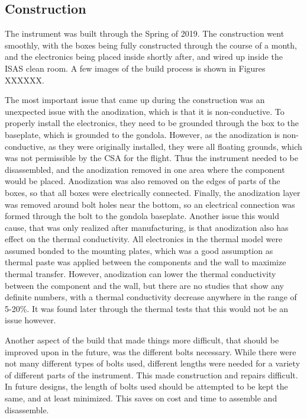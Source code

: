 \subsection{Construction}
The instrument was built through the Spring of 2019. The construction went smoothly, with the boxes being fully constructed through the course of a month, and the electronics being placed inside shortly after, and wired up inside the ISAS clean room. A few images of the build process is shown in Figures XXXXXX.

The most important issue that came up during the construction was an unexpected issue with the anodization, which is that it is non-conductive. To properly install the electronics, they need to be grounded through the box to the baseplate, which is grounded to the gondola. However, as the anodization is non-conductive, as they were originally installed, they were all floating grounds, which was not permissible by the CSA for the flight. Thus the instrument needed to be disassembled, and the anodization removed in one area where the component would be placed. Anodization was also removed on the edges of parts of the boxes, so that all boxes were electrically connected. Finally, the anodization layer was removed around bolt holes near the bottom, so an electrical connection was formed through the bolt to the gondola baseplate. Another issue this would cause, that was only realized after manufacturing, is that anodization also has effect on the thermal conductivity. All electronics in the thermal model were assumed bonded to the mounting plates, which was a good assumption as thermal paste was applied between the components and the wall to maximize thermal transfer. However, anodization can lower the thermal conductivity between the component and the wall, but there are no studies that show any definite numbers, with a thermal conductivity decrease anywhere in the range of 5-20\%. It was found later through the thermal tests that this would not be an issue however.

Another aspect of the build that made things more difficult, that should be improved upon in the future, was the different bolts necessary. While there were not many different types of bolts used, different lengths were needed for a variety of different parts of the instrument. This made construction and repairs difficult. In future designs, the length of bolts used should be attempted to be kept the same, and at least minimized. This saves on cost and time to assemble and disassemble.


